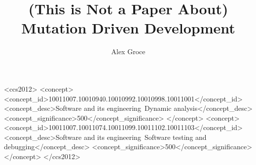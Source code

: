\documentclass[sigplan,screen]{acmart}
\begin{document}
\title{(This is Not a Paper About)\\ Mutation Driven Development}

\author{Alex Groce}

\renewcommand{\shortauthors}{Alex Groce}

\begin{CCSXML}
<ccs2012>
<concept>
<concept_id>10011007.10010940.10010992.10010998.10011001</concept_id>
<concept_desc>Software and its engineering~Dynamic analysis</concept_desc>
<concept_significance>500</concept_significance>
</concept>
<concept>
<concept_id>10011007.10011074.10011099.10011102.10011103</concept_id>
<concept_desc>Software and its engineering~Software testing and debugging</concept_desc>
<concept_significance>500</concept_significance>
</concept>
</ccs2012>
\end{CCSXML}


\end{document}
